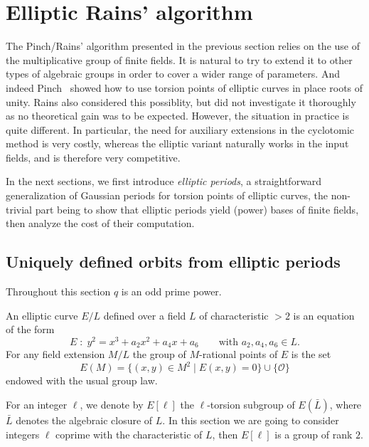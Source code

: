 \documentclass[12pt]{article}
\theoremstyle{plain}
\theoremstyle{definition}
\newcounter{algorithm}
\begin{document}

\section{Elliptic Rains' algorithm}
\label{sec:rains-elliptic}

The Pinch/Rains' algorithm presented in the previous section relies on the use
of the multiplicative group of finite fields.
It is natural to try to extend it to other types of algebraic groups in
order to cover a wider range of parameters.
And indeed Pinch~\cite{Pinch} showed how to use torsion points of elliptic
curves in place roots of unity.
Rains also considered this possiblity, but did not investigate it thoroughly
as no theoretical gain was to be expected.
However, the situation in practice is quite different.
In particular, the need for auxiliary extensions in the cyclotomic method
is very costly, whereas the elliptic variant naturally works in the input 
fields, and is therefore very competitive.

In the next sections, we first introduce \emph{elliptic periods}, a
straightforward generalization of Gaussian periods for torsion points
of elliptic curves, the non-trivial part being to show that
elliptic periods yield (power) bases of finite fields,
then analyze the cost of their computation.

\subsection{Uniquely defined orbits from elliptic periods}

Throughout this section $q$ is an odd prime power. 

An elliptic curve $E/L$ defined over a field $L$ of characteristic
$>2$ is an equation of the form
\begin{equation*}
  E\;:\; y^2 = x^3 + a_2x^2 + a_4x + a_6
  \qquad\text{with $a_2,a_4,a_6\in L$.}
\end{equation*}
For any field extension $M/L$ the group of $M$-rational points of $E$
is the set
\begin{equation*}
  E(M) = \{(x,y)\in M^2 \mid E(x,y) = 0\} \cup \{\mathcal{O}\}
\end{equation*}
endowed with the usual group law.

For an integer $\ell$, we denote by $E[\ell]$ the $\ell$-torsion
subgroup of $E(\bar{L})$, where $\bar{L}$ denotes the algebraic
closure of $L$. In this section we are going to consider integers
$\ell$ coprime with the characteristic of $L$, then $E[\ell]$ is a
group of rank $2$.
\end{document}
